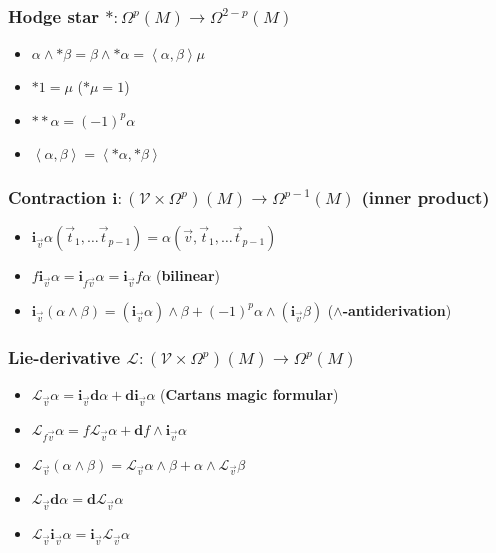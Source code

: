 \documentclass{scrartcl}
\newcommand{\exd}{\mathbf{d}}
\renewcommand{\i}{\mathbf{i}}
\renewcommand{\L}{\mathbf{\mathcal{L}}}
\begin{document}
      \subsubsection{Hodge star \( *:\Omega^{p}(M)\rightarrow\Omega^{2-p}(M) \)}
        \begin{itemize}
          \item \( \alpha \wedge *\beta = \beta \wedge *\alpha = \left\langle \alpha,\beta \right\rangle\mu \)
          \item \( *1 = \mu \) \quad(\( *\mu = 1 \))
          \item \( **\alpha = (-1)^{p}\alpha \)
          \item \( \left\langle \alpha, \beta \right\rangle =  \left\langle *\alpha, *\beta \right\rangle\)
        \end{itemize}

      \subsubsection{Contraction \( \i:\left(\mathcal{V}\times\Omega^{p}\right)(M)\rightarrow\Omega^{p-1}(M) \) (inner product)}
        \begin{itemize}
          \item \( \i_{\vec{v}}\alpha\left( \vec{t}_{1},\ldots\vec{t}_{p-1} \right) = \alpha\left(\vec{v}, \vec{t}_{1},\ldots\vec{t}_{p-1} \right) \)
          \item \( f\i_{\vec{v}}\alpha = \i_{f\vec{v}}\alpha 
                                       = \i_{\vec{v}}f\alpha \)
                (\textbf{bilinear})
          \item \( \i_{\vec{v}}\left( \alpha\wedge\beta \right) 
                    = \left( \i_{\vec{v}}\alpha \right)\wedge\beta + (-1)^{p}\alpha\wedge\left( \i_{\vec{v}}\beta \right)\)
                (\textbf{\( \wedge \)-antiderivation})
        \end{itemize}

      \subsubsection{Lie-derivative \( \L:\left(\mathcal{V}\times\Omega^{p}\right)(M)\rightarrow\Omega^{p}(M) \)}
        \begin{itemize}
          \item \(\L_{\vec{v}}\alpha = \i_{\vec{v}}\exd\alpha + \exd\i_{\vec{v}}\alpha\) 
          (\textbf{Cartans magic formular})
          \item  \( \L_{f\vec{v}}\alpha = f\L_{\vec{v}}\alpha + \exd f\wedge\i_{\vec{v}}\alpha\)
          \item \( \L_{\vec{v}}\left( \alpha\wedge\beta \right) = \L_{\vec{v}}\alpha\wedge\beta + \alpha\wedge\L_{\vec{v}}\beta\)
          \item \(\L_{\vec{v}}\exd\alpha = \exd\L_{\vec{v}}\alpha \)
          \item \(\L_{\vec{v}}\i_{\vec{v}}\alpha = \i_{\vec{v}}\L_{\vec{v}}\alpha \)
        \end{itemize}
\end{document}

